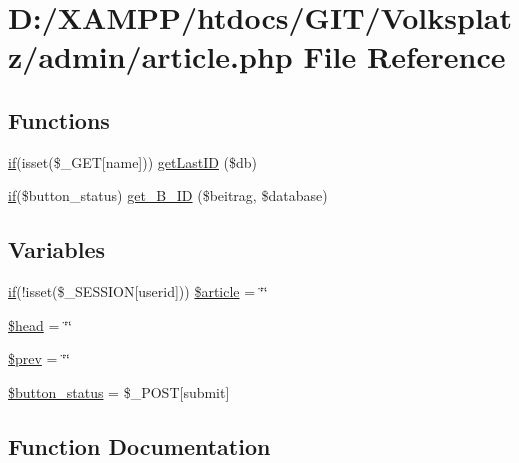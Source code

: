 \hypertarget{article_8php}{}\section{D\+:/\+X\+A\+M\+P\+P/htdocs/\+G\+I\+T/\+Volksplatz/admin/article.php File Reference}
\label{article_8php}
\subsection*{Functions}
\begin{DoxyCompactItemize}
\item 
\mbox{\hyperlink{view__all_8php_ac0971e25a4f61580752c758ef520f6b2}{if}}(isset(\$\+\_\+\+G\+ET\mbox{[}\textquotesingle{}name\textquotesingle{}\mbox{]})) \mbox{\hyperlink{article_8php_ae43551f2fe671754d63f6ac76df2678a}{get\+Last\+ID}} (\$db)
\item 
\mbox{\hyperlink{view__all_8php_ac0971e25a4f61580752c758ef520f6b2}{if}}(\$button\+\_\+status) \mbox{\hyperlink{article_8php_a0c184a846de03589700bebfc63aec7ac}{get\+\_\+\+B\+\_\+\+ID}} (\$beitrag, \$database)
\end{DoxyCompactItemize}
\subsection*{Variables}
\begin{DoxyCompactItemize}
\item 
\mbox{\hyperlink{view__all_8php_ac0971e25a4f61580752c758ef520f6b2}{if}}(!isset(\$\+\_\+\+S\+E\+S\+S\+I\+ON\mbox{[}\textquotesingle{}userid\textquotesingle{}\mbox{]})) \mbox{\hyperlink{article_8php_a238e6e54982a8ccc25883c572b4f5b9f}{\$article}} = \char`\"{}\char`\"{}
\item 
\mbox{\hyperlink{article_8php_a687ea7fcd78263867b5bd34ed56b6379}{\$head}} = \char`\"{}\char`\"{}
\item 
\mbox{\hyperlink{article_8php_a6a84acde87e05eb2ec8ca7d45fe7d0c1}{\$prev}} = \char`\"{}\char`\"{}
\item 
\mbox{\hyperlink{article_8php_a14d960637bc06d7414afcbf6a2bcfabf}{\$button\+\_\+status}} = \$\+\_\+\+P\+O\+ST\mbox{[}\textquotesingle{}submit\textquotesingle{}\mbox{]}
\end{DoxyCompactItemize}


\subsection{Function Documentation}
\mbox{\label{article_8php_a0c184a846de03589700bebfc63aec7ac}} 
